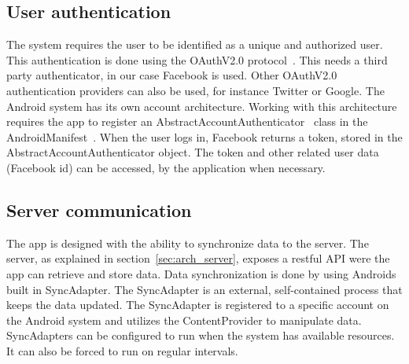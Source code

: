\subsection{User authentication}

The system requires the user to be identified as a unique and authorized user. This authentication is done using the OAuthV2.0 protocol~\cite{oauthv2.0}. This needs a third party authenticator, in our case Facebook is used. Other OAuthV2.0 authentication providers can also be used, for instance Twitter or Google.
The Android system has its own account architecture. Working with this architecture requires the app to register an AbstractAccountAuthenticator~\cite{androidAccount} class in the AndroidManifest~\cite{androidmanifest}. When the user logs in, Facebook returns a token, stored in the AbstractAccountAuthenticator object. The token and other related user data (Facebook id) can be accessed, by the application when necessary.

\subsection{Server communication}
The app is designed with the ability to synchronize data to the server. The server, as explained in section~\ref{sec:arch_server}, exposes a restful \gls{API} were the app can retrieve and store data. Data synchronization is done by using Androids built in SyncAdapter. The SyncAdapter is an external, self-contained process that keeps the data updated. The SyncAdapter is registered to a specific account on the Android system and utilizes the ContentProvider to manipulate data. SyncAdapters can be configured to run when the system has available resources. It can also be forced to run on regular intervals.
